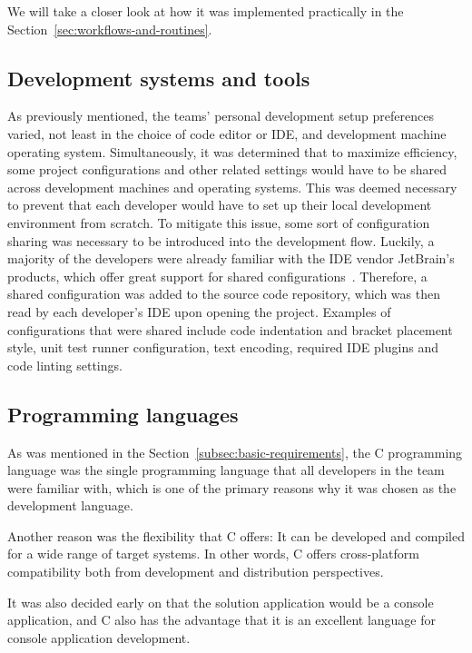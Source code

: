 We will take a closer look at how it was implemented practically in the Section~\ref{sec:workflows-and-routines}.

\subsection{Development systems and tools}\label{subsec:development-systems-and-tools}

As previously mentioned, the teams' personal development setup preferences varied, not least in the choice of code
editor or IDE, and development machine operating system.
Simultaneously, it was determined that to maximize efficiency, some project configurations and other related settings
would have to be shared across development machines and operating systems.
This was deemed necessary to prevent that each developer would have to set up their local development environment
from scratch.
To mitigate this issue, some sort of configuration sharing was necessary to be introduced into the development flow.
Luckily, a majority of the developers were already familiar with the IDE vendor JetBrain's products, which offer great
support for shared configurations~\cite{shared-config}.
Therefore, a shared configuration was added to the source code repository, which was then read by each developer's
IDE upon opening the project.
Examples of configurations that were shared include code indentation and bracket placement style, unit test runner
configuration, text encoding, required IDE plugins and code linting settings.

\subsection{Programming languages}\label{subsec:programming-languages}

As was mentioned in the Section~\ref{subsec:basic-requirements}, the C programming language was the single
programming language that all developers in the team were familiar with, which is one of the primary reasons why it was
chosen as the development language.

Another reason was the flexibility that C offers: It can be developed and compiled for a wide range of target systems.
In other words, C offers cross-platform compatibility both from development and distribution perspectives.

It was also decided early on that the solution application would be a console application, and C also has the advantage
that it is an excellent language for console application development.

